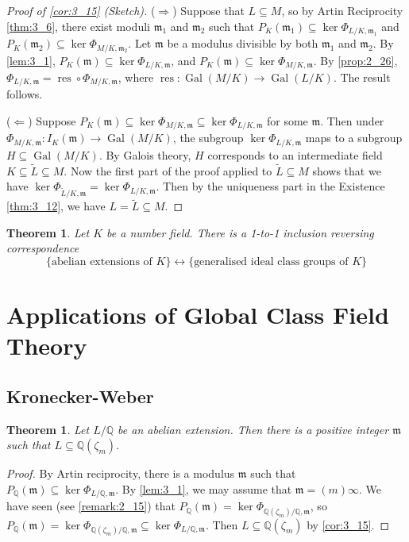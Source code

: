 \documentclass[11pt]{article}
\theoremstyle{definition}
\theoremstyle{plain}
\newtheorem{theorem}[definition]{Theorem}
\theoremstyle{remark}
\DeclareMathOperator{\Gal}{Gal}
\DeclareMathOperator{\res}{res}
\newcommand{\QQ}{\mathbb{Q}}
\newcommand{\fm}{\mathfrak{m}}
\begin{document}
\begin{proof}[Proof of \autoref{cor:3_15} (Sketch)]
    ($\Rightarrow$) Suppose that $L \subseteq M$, so by Artin Reciprocity \autoref{thm:3_6}, there exist moduli $\fm_1$ and $\fm_2$ such that $P_K(\fm_1) \subseteq \ker \Phi_{L/K, \fm_1}$ and $P_K(\fm_2) \subseteq \ker \Phi_{M/K, \fm_2}$. Let $\fm$ be a modulus divisible by both $\fm_1$ and $\fm_2$. By \autoref{lem:3_1}, $P_K(\fm) \subseteq \ker \Phi_{L/K,\fm}$, and $P_K(\fm) \subseteq \ker \Phi_{M/K,\fm}$. By \autoref{prop:2_26}, $\Phi_{L/K, \fm} = \res \circ \Phi_{M/K, \fm}$, where $\res : \Gal(M/K) \to \Gal(L/K)$. The result follows.

    ($\Leftarrow$) Suppose $P_K(\fm) \subseteq \ker \Phi_{M/K, \fm} \subseteq \ker \Phi_{L/K, \fm}$ for some $\fm$. Then under $\Phi_{M/K, \fm} : I_K(\fm) \to \Gal(M/K)$, the subgroup $\ker \Phi_{L/K, \fm}$ maps to a subgroup $H \subseteq \Gal(M/K)$. By Galois theory, $H$ corresponds to an intermediate field $K \subseteq \widetilde{L} \subseteq M$. Now the first part of the proof applied to $\widetilde{L} \subseteq M$ shows that we have $\ker \Phi_{\widetilde{L}/K, \fm} = \ker \Phi_{L/K, \fm}$. Then by the uniqueness part in the Existence \autoref{thm:3_12}, we have $L = \widetilde{L} \subseteq M$.
\end{proof}

\begin{theorem}\label{thm:3_17}
    Let $K$ be a number field. There is a 1-to-1 inclusion reversing correspondence
    \begin{equation*}
        \{\text{abelian extensions of } K\} \longleftrightarrow \{\text{generalised ideal class groups of } K\}
    \end{equation*}
\end{theorem}

\section{Applications of Global Class Field Theory}

\subsection{Kronecker-Weber}

\begin{theorem}\label{thm:4_1}
    Let $L/\QQ$ be an abelian extension. Then there is a positive integer $\fm$ such that $L \subseteq \QQ(\zeta_m)$.
\end{theorem}
\begin{proof}
    By Artin reciprocity, there is a modulus $\fm$ such that $P_\QQ(\fm) \subseteq \ker \Phi_{L/\QQ, \fm}$. By \autoref{lem:3_1}, we may assume that $\fm = (m) \infty$. We have seen (see \autoref{remark:2_15}) that $P_\QQ(\fm) = \ker \Phi_{\QQ(\zeta_m)/\QQ, \fm}$, so $P_\QQ(\fm) = \ker \Phi_{\QQ(\zeta_m)/\QQ, \fm} \subseteq \ker \Phi_{L/\QQ, \fm}$. Then $L \subseteq \QQ(\zeta_m)$ by \autoref{cor:3_15}.
\end{proof}
\end{document}
